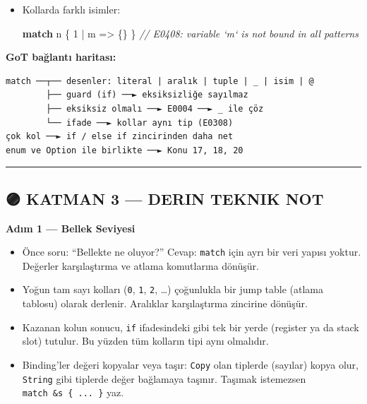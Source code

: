 \documentclass[12pt,a4paper]{article}
\newenvironment{Shaded}{}{}
\newcommand{\CommentTok}[1]{\textcolor[rgb]{0.38,0.63,0.69}{\textit{#1}}}
\newcommand{\ControlFlowTok}[1]{\textcolor[rgb]{0.00,0.44,0.13}{\textbf{#1}}}
\newcommand{\DecValTok}[1]{\textcolor[rgb]{0.25,0.63,0.44}{#1}}
\newcommand{\NormalTok}[1]{#1}
\newcommand{\OperatorTok}[1]{\textcolor[rgb]{0.40,0.40,0.40}{#1}}
\begin{document}
\begin{itemize}
\begin{Shaded}
\begin{Highlighting}[]
\ControlFlowTok{match}\NormalTok{ n }\OperatorTok{\{}\NormalTok{ \_ }\OperatorTok{=\textgreater{}} \OperatorTok{\{\},} \DecValTok{1} \OperatorTok{=\textgreater{}} \OperatorTok{\{\}} \OperatorTok{\}}
\CommentTok{// warning: unreachable pattern}
\end{Highlighting}
\end{Shaded}
\item
  Kollarda farklı isimler:

\begin{Shaded}
\begin{Highlighting}[]
\ControlFlowTok{match}\NormalTok{ n }\OperatorTok{\{} \DecValTok{1} \OperatorTok{|}\NormalTok{ m }\OperatorTok{=\textgreater{}} \OperatorTok{\{\}} \OperatorTok{\}}
\CommentTok{// E0408: variable `m` is not bound in all patterns}
\end{Highlighting}
\end{Shaded}
\end{itemize}

\textbf{GoT bağlantı haritası:}

\begin{verbatim}
match ──┬── desenler: literal | aralık | tuple | _ | isim | @
        ├── guard (if) ──► eksiksizliğe sayılmaz
        ├── eksiksiz olmalı ──► E0004 ──► _ ile çöz
        └── ifade ──► kollar aynı tip (E0308)
çok kol ──► if / else if zincirinden daha net
enum ve Option ile birlikte ──► Konu 17, 18, 20
\end{verbatim}

\begin{center}\rule{0.5\linewidth}{0.5pt}\end{center}

\subsection{🟣 KATMAN 3 --- DERIN TEKNIK NOT}\label{katman-3-—-derin-teknik-not-7}

\textbf{Adım 1 --- Bellek Seviyesi}

\begin{itemize}
\tightlist
\item
  Önce soru: ``Bellekte ne oluyor?'' Cevap: \texttt{match} için ayrı bir veri yapısı yoktur. Değerler karşılaştırma ve atlama komutlarına dönüşür.
\item
  Yoğun tam sayı kolları (\texttt{0}, \texttt{1}, \texttt{2}, \ldots) çoğunlukla bir jump table (atlama tablosu) olarak derlenir. Aralıklar karşılaştırma zincirine dönüşür.
\item
  Kazanan kolun sonucu, \texttt{if} ifadesindeki gibi tek bir yerde (register ya da stack slot) tutulur. Bu yüzden tüm kolların tipi aynı olmalıdır.
\item
  Binding'ler değeri kopyalar veya taşır: \texttt{Copy} olan tiplerde (sayılar) kopya olur, \texttt{String} gibi tiplerde değer bağlamaya taşınır. Taşımak istemezsen \texttt{match\ \&s\ \{\ ...\ \}} yaz.
\end{itemize}
\end{document}
